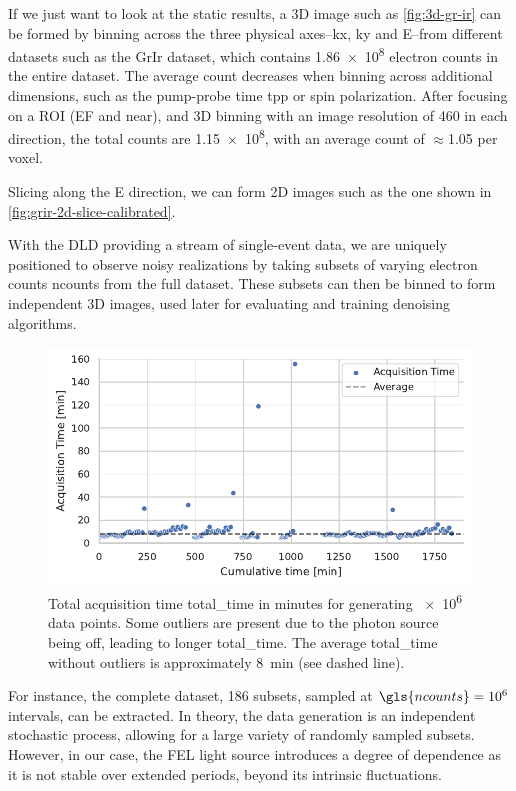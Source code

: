 If we just want to look at the static results, a 3D image such as \cref{fig:3d-gr-ir} can be formed by binning across the three physical axes--\gls{kx}, \gls{ky} and \gls{E}--from different datasets such as the \gls{GrIr} dataset, which contains \num{1.86e8} electron counts in the entire dataset. The average count decreases when binning across additional dimensions, such as the pump-probe time \gls{tpp} or spin polarization. After focusing on a \gls{ROI} (\gls{EF} and near), and 3D binning with an image resolution of \num{460} in each direction, the total counts are \num{1.15e8}, with an average count of $\approx$1.05 per voxel. 

Slicing along the \gls{E} direction, we can form 2D images such as the one shown in \cref{fig:grir-2d-slice-calibrated}.

With the \gls{DLD} providing a stream of single-event data, we are uniquely positioned to observe noisy realizations by taking subsets of varying electron counts \gls{ncounts} from the full dataset. These subsets can then be binned to form independent 3D images, used later for evaluating and training denoising algorithms.

\begin{figure}
    \centering
    \includegraphics[width=0.8\linewidth]{images/acq_time_1M.pdf}
    \caption{Total acquisition time \gls{total_time} in minutes for generating \num{e6} data points. Some outliers are present due to the photon source being off, leading to longer \gls{total_time}. The average \gls{total_time} without outliers is approximately \qty{8}{min} (see dashed line).}
    \label{fig:acq-time-1M}
\end{figure}


 For instance, the complete dataset, \num{186} subsets, sampled at $\gls{ncounts}=\num{e6}$ intervals, can be extracted. In theory, the data generation is an independent stochastic process, allowing for a large variety of randomly sampled subsets. However, in our case, the \gls{FEL} light source introduces a degree of dependence as it is not stable over extended periods, beyond its intrinsic fluctuations.


